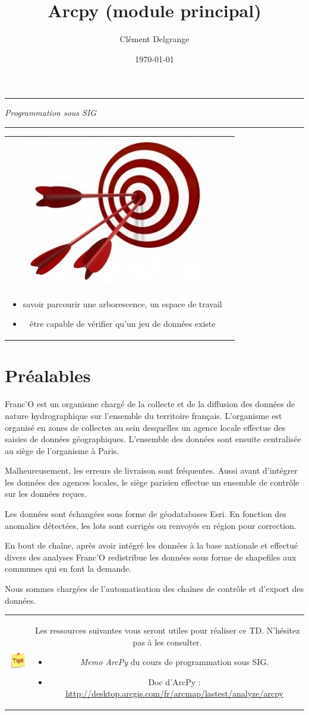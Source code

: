 \documentclass[11pt]{article}
\title{Arcpy (module principal)}
\author{Clément Delgrange}
\date{\today}
\newenvironment{note}{%
	\begin{tabular}[t t]{c c}
		\includegraphics{img/tips.png}
		 &
		\begin{minipage}[c]{0.9\linewidth}
			\begin{sffamily}
}{%
			\end{sffamily}
		\end{minipage}
	\end{tabular}	
}
\newenvironment{objectifs}{
	\begin{lrbox}{\mybox}
		\begin{minipage}{0.9\textwidth}
			\vspace{1em}
			\begin{tabular}[t t]{c c}
				\includegraphics[width=0.1\linewidth]{img/goals.jpg} &
				\begin{minipage}[c]{0.8\linewidth}
					\hspace{2em}\textbf{\large{Objectifs :}} \\
}{
				\end{minipage}
			\end{tabular}
			\vspace{1em}
		\end{minipage}
	\end{lrbox}
	\fbox{\usebox{\mybox}}
}
\begin{document}
\parindent=0cm

\makeatletter
\begin{center}
	\hrule
	\vspace{1em}
	{\small \textit{Programmation sous SIG}}\\	
	\vspace{0.5em}
	{\Large \bfseries{\@title}}
	\vspace{1em}
	\hrule
\end{center}
\makeatother



\begin{objectifs}
\begin{itemize}
	\item savoir parcourir une arborescence, un espace de travail
	\item être capable de vérifier qu'un jeu de données existe
\end{itemize}
\end{objectifs}




\section*{Préalables}
Franc'O est un organisme chargé de la collecte et de la diffusion des données de nature hydrographique sur l'ensemble du territoire français. L'organisme est organisé en zones de collectes au sein desquelles un agence locale effectue des saisies de données géographiques. L'ensemble des données sont ensuite centralisée au siège de l'organisme à Paris.

Malheureusement, les erreurs de livraison sont fréquentes. Aussi avant d'intégrer les données des agences locales, le siège parisien effectue un ensemble de contrôle sur les données reçues.

Les données sont échangées sous forme de géodatabases Esri. En fonction des anomalies détectées, les lots sont corrigés ou renvoyés en région pour correction.

En bout de chaîne, après avoir intégré les données à la base nationale et effectué divers des analyses Franc'O redistribue les données sous forme de shapefiles aux communes qui en font la demande.

Nous sommes chargées de l'automatisation des chaînes de contrôle et d'export des données. 

\begin{note}
Les ressources suivantes vous seront utiles pour réaliser ce TD. N'hésitez pas à les consulter.
\begin{itemize}
	\item \textit{Memo ArcPy} du cours de programmation sous SIG.
	\item Doc d'ArcPy : \url{http://desktop.arcgis.com/fr/arcmap/lastest/analyze/arcpy}
\end{itemize}
\end{note}
\end{document}
